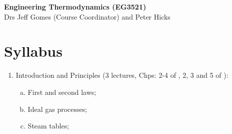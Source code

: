\documentclass[11pt,oneside,a4paper]{article}
\begin{document}
\setcounter{page}{1}

\begin{center}
{\bf {\Large Engineering Thermodynamics (EG3521)}}\\
{\large Drs Jeff Gomes (Course Coordinator) and Peter Hicks}
\end{center}


\section{ Syllabus }

\begin{enumerate}[{\bf Module 1:}]
%
\item Introduction and Principles (3 lectures, Chps: 2-4 of \cite{smith_2001}, 2, 3 and 5 of \cite{borgnakke_2013}):
\begin{enumerate}[(a)]
\item First and second laws;
\item Ideal gas processes;
\item Steam tables; 
\end{enumerate}


\end{enumerate}
\end{document}
